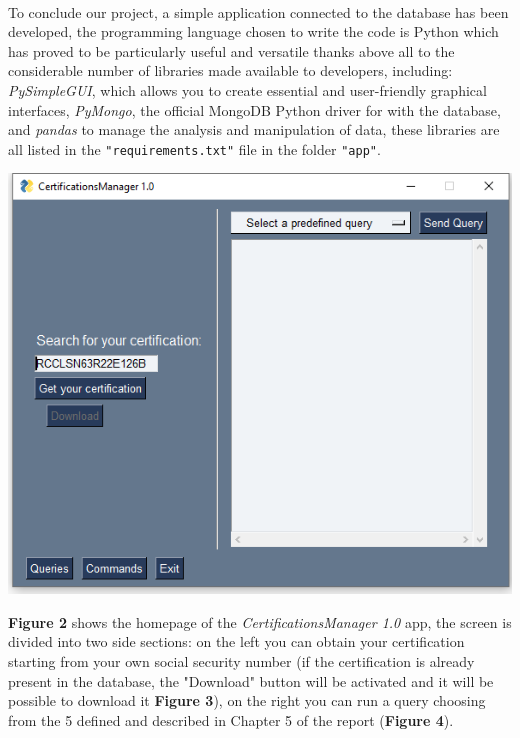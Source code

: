 \documentclass[a4paper,12pt]{article}
\begin{document}
\paragraph{}To conclude our project, a simple application connected to the database has been developed, the programming language chosen to write the code is Python which has proved to be particularly useful and versatile thanks above all to the considerable number of libraries made available to developers, including: \emph{PySimpleGUI}, which allows you to create essential and user-friendly graphical interfaces, \emph{PyMongo}, the official MongoDB Python driver for with the database, and \emph{pandas} to manage the analysis and manipulation of data, these libraries are all listed in the \texttt{"requirements.txt"} file in the folder \texttt{"app"}. \par
\begin{center}
 		\includegraphics[width = 13 cm]{homepage.png}
\end{center}
\clearpage
\textbf{Figure 2} shows the homepage of the \emph{CertificationsManager 1.0} app, the screen is divided into two side sections: on the left you can obtain your certification starting from your own social security number (if the certification is already present in the database, the "Download" button will be activated and it will be possible to download it \textbf{Figure 3}), on the right you can run a query choosing from the 5 defined and described in Chapter 5 of the report (\textbf{Figure 4}). \par
\end{document}
